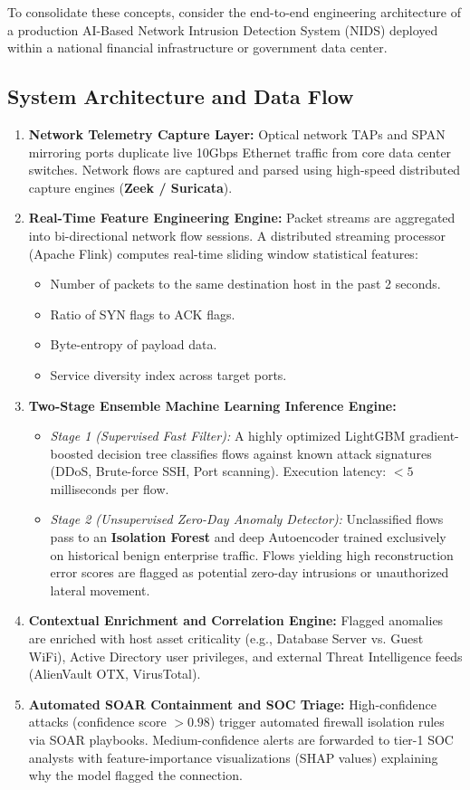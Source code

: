 To consolidate these concepts, consider the end-to-end engineering architecture of a production AI-Based Network Intrusion Detection System (NIDS) deployed within a national financial infrastructure or government data center.

\subsection{System Architecture and Data Flow}

\begin{enumerate}
\item \textbf{Network Telemetry Capture Layer:}
Optical network TAPs and SPAN mirroring ports duplicate live 10Gbps Ethernet traffic from core data center switches. Network flows are captured and parsed using high-speed distributed capture engines (\textbf{Zeek / Suricata}).
\item \textbf{Real-Time Feature Engineering Engine:}
Packet streams are aggregated into bi-directional network flow sessions. A distributed streaming processor (Apache Flink) computes real-time sliding window statistical features:
\begin{itemize}
\item Number of packets to the same destination host in the past 2 seconds.
\item Ratio of SYN flags to ACK flags.
\item Byte-entropy of payload data.
\item Service diversity index across target ports.
\end{itemize}
\item \textbf{Two-Stage Ensemble Machine Learning Inference Engine:}
\begin{itemize}
\item \textit{Stage 1 (Supervised Fast Filter):} A highly optimized LightGBM gradient-boosted decision tree classifies flows against known attack signatures (DDoS, Brute-force SSH, Port scanning). Execution latency: $< 5$ milliseconds per flow.
\item \textit{Stage 2 (Unsupervised Zero-Day Anomaly Detector):} Unclassified flows pass to an \textbf{Isolation Forest} and deep Autoencoder trained exclusively on historical benign enterprise traffic. Flows yielding high reconstruction error scores are flagged as potential zero-day intrusions or unauthorized lateral movement.
\end{itemize}
\item \textbf{Contextual Enrichment and Correlation Engine:}
Flagged anomalies are enriched with host asset criticality (e.g., Database Server vs. Guest WiFi), Active Directory user privileges, and external Threat Intelligence feeds (AlienVault OTX, VirusTotal).
\item \textbf{Automated SOAR Containment and SOC Triage:}
High-confidence attacks (confidence score $> 0.98$) trigger automated firewall isolation rules via SOAR playbooks. Medium-confidence alerts are forwarded to tier-1 SOC analysts with feature-importance visualizations (SHAP values) explaining why the model flagged the connection.
\end{enumerate}

